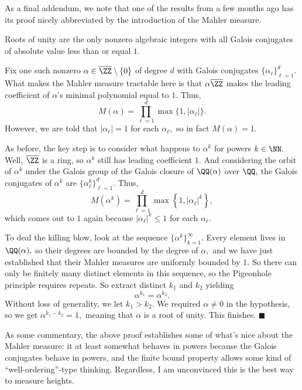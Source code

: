 As a final addendum, we note that one of the results from a few months ago has its proof nicely abbreviated by the introduction of the Mahler measure.
\begin{proposition}
    Roots of unity are the only nonzero algebraic integers with all Galois conjugates of absolute value less than or equal $1.$
\end{proposition}
Fix one such nonzero $\alpha\in\overline\ZZ\setminus\{0\}$ of degree $d$ with Galois conjugates $\{\alpha_\ell\}_{\ell=1}^d.$ What makes the Mahler measure tractable here is that $\alpha\overline\ZZ$ makes the leading coefficient of $\alpha$'s minimal polynomial equal to $1.$ Thus,
\[M(\alpha)=\prod_{\ell=1}^d\max\{1,|\alpha_\ell|\}.\]
However, we are told that $|\alpha_\ell|=1$ for each $\alpha_\ell,$ so in fact $M(\alpha)=1.$

As before, the key step is to consider what happens to $\alpha^k$ for powers $k\in\NN.$ Well, $\overline\ZZ$ is a ring, so $\alpha^k$ still has leading coefficient $1.$ And considering the orbit of $\alpha^k$ under the Galois group of the Galois closure of $\QQ(\alpha)$ over $\QQ,$ the Galois conjugates of $\alpha^k$ are $\{\alpha_\ell^k\}_{\ell=1}^d.$ Thus,
\[M\left(\alpha^k\right)=\prod_{\ell=1}^d\max\left\{1,|\alpha_\ell|^k\right\},\]
which comes out to $1$ again because $|\alpha_\ell|^k\le1$ for each $\alpha_\ell.$

To deal the killing blow, look at the sequence $\{\alpha^k\}_{k=1}^\infty.$ Every element lives in $\QQ(\alpha),$ so their degrees are bounded by the degree of $\alpha,$ and we have just established that their Mahler measures are uniformly bounded by $1.$ So there can only be finitely many distinct elements in this sequence, so the Pigeonhole principle requires repeats. So extract distinct $k_1$ and $k_2$ yielding
\[\alpha^{k_1}=\alpha^{k_2}.\]
Without loss of generality, we let $k_1>k_2.$ We required $\alpha\ne0$ in the hypothesis, so we get $\alpha^{k_1-k_2}=1,$ meaning that $\alpha$ is a root of unity. This finishes. $\blacksquare$

As some commentary, the above proof establishes some of what's nice about the Mahler measure: it at least somewhat behaves in powers because the Galois conjugates behave in powers, and the finite bound property allows some kind of ``well-ordering''-type thinking. Regardless, I am unconvinced this is the best way to measure heights.


